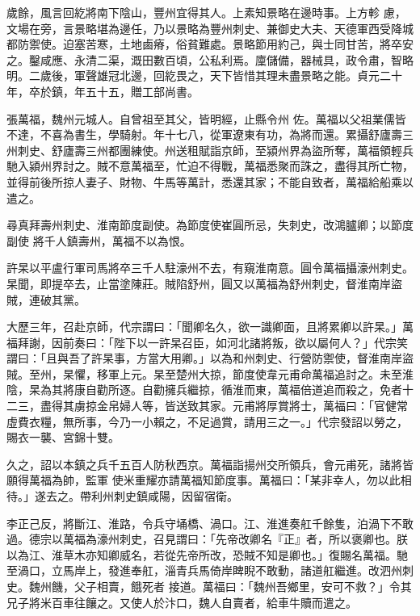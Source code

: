\begin{pinyinscope}
 歲餘，風言回紇將南下陰山，豐州宜得其人。上素知景略在邊時事。上方軫
 慮，文場在旁，言景略堪為邊任，乃以景略為豐州刺史、兼御史大夫、天德軍西受降城都防禦使。迫塞苦寒，土地鹵瘠，俗貧難處。景略節用約己，與士同甘苦，將卒安之。鑿咸應、永清二渠，溉田數百頃，公私利焉。廩儲備，器械具，政令肅，智略明。二歲後，軍聲雄冠北邊，回紇畏之，天下皆惜其理未盡景略之能。貞元二十年，卒於鎮，年五十五，贈工部尚書。



 張萬福，魏州元城人。自曾祖至其父，皆明經，止縣令州
 佐。萬福以父祖業儒皆不達，不喜為書生，學騎射。年十七八，從軍遼東有功，為將而還。累攝舒廬壽三州刺史、舒廬壽三州都團練使。州送租賦詣京師，至潁州界為盜所奪，萬福領輕兵馳入潁州界討之。賊不意萬福至，忙迫不得戰，萬福悉聚而誅之，盡得其所亡物，並得前後所掠人妻子、財物、牛馬等萬計，悉還其家；不能自致者，萬福給船乘以遣之。



 尋真拜壽州刺史、淮南節度副使。為節度使崔圓所忌，失刺史，改鴻臚卿；以節度副使
 將千人鎮壽州，萬福不以為恨。



 許杲以平盧行軍司馬將卒三千人駐濠州不去，有窺淮南意。圓令萬福攝濠州刺史。杲聞，即提卒去，止當塗陳莊。賊陷舒州，圓又以萬福為舒州刺史，督淮南岸盜賊，連破其黨。



 大歷三年，召赴京師，代宗謂曰：「聞卿名久，欲一識卿面，且將累卿以許杲。」萬福拜謝，因前奏曰：「陛下以一許杲召臣，如河北諸將叛，欲以屬何人？」代宗笑謂曰：「且與吾了許杲事，方當大用卿。」以為和州刺史、行營防禦使，督淮南岸盜
 賊。至州，杲懼，移軍上元。杲至楚州大掠，節度使韋元甫命萬福追討之。未至淮陰，杲為其將康自勸所逐。自勸擁兵繼掠，循淮而東，萬福倍道追而殺之，免者十二三，盡得其虜掠金帛婦人等，皆送致其家。元甫將厚賞將士，萬福曰：「官健常虛費衣糧，無所事，今乃一小賴之，不足過賞，請用三之一。」代宗發詔以勞之，賜衣一襲、宮錦十雙。



 久之，詔以本鎮之兵千五百人防秋西京。萬福詣揚州交所領兵，會元甫死，諸將皆願得萬福為帥，監軍
 使米重耀亦請萬福知節度事。萬福曰：「某非幸人，勿以此相待。」遂去之。帶利州刺史鎮咸陽，因留宿衛。



 李正己反，將斷江、淮路，令兵守埇橋、渦口。江、淮進奏舡千餘隻，泊渦下不敢過。德宗以萬福為濠州刺史，召見謂曰：「先帝改卿名『正』者，所以褒卿也。朕以為江、淮草木亦知卿威名，若從先帝所改，恐賊不知是卿也。」復賜名萬福。馳至渦口，立馬岸上，發進奉舡，淄青兵馬倚岸睥睨不敢動，諸道舡繼進。改泗州刺史。魏州饑，父子相賣，餓死者
 接道。萬福曰：「魏州吾鄉里，安可不救？」令其兄子將米百車往饟之。又使人於汴口，魏人自賣者，給車牛贖而遣之。




\end{pinyinscope}
